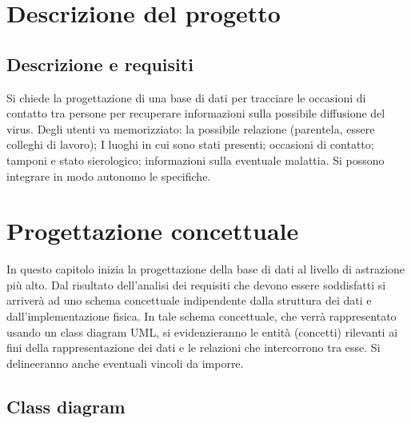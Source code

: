 \documentclass[a4paper]{book}
\begin{document}
	
	\chapter{Descrizione del progetto}
	\section{Descrizione e requisiti}
	
	Si chiede la progettazione di una base di dati per tracciare le occasioni di contatto tra persone per recuperare informazioni sulla possibile diffusione del virus. Degli utenti va memorizziato: la possibile relazione (parentela, essere colleghi di lavoro); I luoghi in cui sono stati presenti; occasioni di contatto; tamponi e stato sierologico; informazioni sulla eventuale malattia. Si possono integrare in modo autonomo le specifiche.
	
	\chapter{Progettazione concettuale}

	
	In questo capitolo inizia la progettazione della base di dati al livello di astrazione più alto.
Dal risultato dell’analisi dei requisiti che devono essere soddisfatti si arriverà ad uno schema
concettuale indipendente dalla struttura dei dati e dall’implementazione fisica. In tale schema
concettuale, che verrà rappresentato usando un class diagram UML, si evidenzieranno le entità
(concetti) rilevanti ai fini della rappresentazione dei dati e le relazioni che intercorrono tra esse.
Si delineeranno anche eventuali vincoli da imporre.
	
	\section{Class diagram}
	
\end{document}
